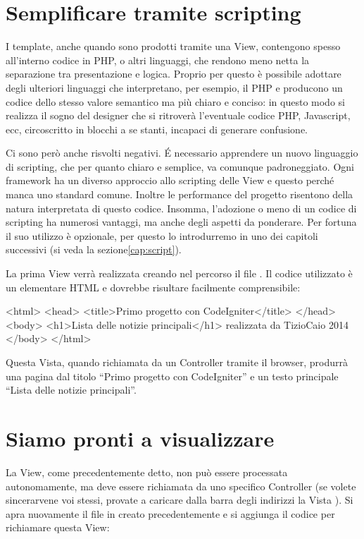\section*{Semplificare tramite scripting}
I template, anche quando sono prodotti tramite una View, contengono spesso all'interno codice in \ac{PHP}, o altri linguaggi, che rendono meno netta la separazione tra presentazione e logica. Proprio per questo è possibile adottare degli ulteriori linguaggi che interpretano, per esempio, il \ac{PHP} e producono un codice dello stesso valore semantico ma più chiaro e conciso: in questo modo si realizza il sogno del designer che si ritroverà l'eventuale codice \ac{PHP}, Javascript, ecc, circoscritto in blocchi a se stanti, incapaci di generare confusione.

Ci sono però anche risvolti negativi. \'E necessario apprendere un nuovo linguaggio di scripting, che per quanto chiaro e semplice, va comunque padroneggiato. Ogni framework ha un diverso approccio allo scripting delle View e questo perché manca uno standard comune. Inoltre le performance del progetto risentono della natura interpretata di questo codice. Insomma, l'adozione o meno di un codice di scripting ha numerosi vantaggi, ma anche degli aspetti da ponderare. Per fortuna il suo utilizzo è opzionale, per questo lo introdurremo in uno dei capitoli successivi (si veda la sezione\vref{cap:script}).

La prima View verrà realizzata creando nel percorso  il file . Il codice utilizzato è un elementare \ac{HTML} e dovrebbe risultare facilmente comprensibile:

\label{list:template}
\begin{html}
<html>
<head>
<title>Primo progetto con CodeIgniter</title>
</head>
<body>
<h1>Lista delle notizie principali</h1>
realizzata da TizioCaio 2014
</body>
</html>
\end{html}

Questa Vista, quando richiamata da un Controller tramite il browser, produrrà una pagina dal titolo ``Primo progetto con CodeIgniter'' e un testo principale ``Lista delle notizie principali''.

\section*{Siamo pronti a visualizzare}
La View, come precedentemente detto, non può essere processata autonomamente, ma deve essere richiamata da uno specifico Controller (se volete sincerarvene voi stessi, provate a caricare dalla barra degli indirizzi la Vista ). Si apra nuovamente il file  in  creato precedentemente e si aggiunga il codice per richiamare questa View:

